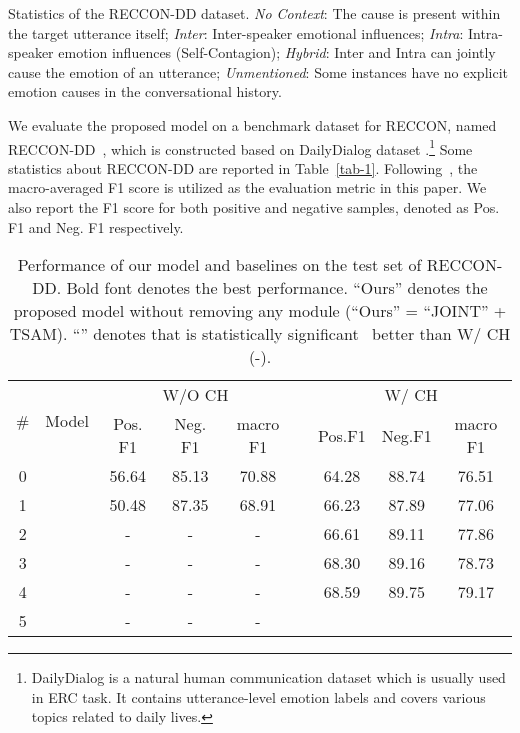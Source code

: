 \documentclass[11pt]{article}
\begin{document}
\begin{table}[tbp]
\caption{Statistics of the RECCON-DD dataset. \textit{No Context}: The cause is present within the target utterance itself; \textit{Inter}: Inter-speaker emotional influences; \textit{Intra}: Intra-speaker emotion influences (Self-Contagion); \textit{Hybrid}: Inter and Intra can jointly cause the emotion of an utterance; \textit{Unmentioned}: Some instances have no explicit emotion causes in the conversational history.}
\label{tab-1}
\end{table}
	
We evaluate the proposed model on a benchmark dataset for RECCON, named RECCON-DD~\citep{poria2021recognizing}, which is constructed based on DailyDialog dataset \cite{li2017dailydialog}.\footnote{DailyDialog is a natural human communication dataset which is usually used in ERC task. It contains utterance-level emotion labels and covers various topics related to daily lives.} Some statistics about RECCON-DD are reported in Table~\ref{tab-1}. Following~\citep{poria2021recognizing}, the macro-averaged F1 score is utilized as the evaluation metric in this paper. We also report the F1 score for both positive and negative samples, denoted as Pos. F1 and Neg. F1 respectively. 


\begin{table*}[tbp]
\centering
\begin{tabular}{@{}c|c|ccccccc@{}}
\hline
\multirow{2}{*}{\#} & \multirow{2}{*}{Model} & \multicolumn{3}{c}{W/O CH}   &  & \multicolumn{3}{c}{W/ CH}  \\ \cmidrule(lr){3-5} \cmidrule(l){7-9} 
                    &                        & Pos. F1 & Neg. F1 & macro F1 &  & Pos.F1 & Neg.F1 & macro F1 \\ \hline\hline
0                   &             &    56.64     &    85.13     &   70.88       &  &    64.28    &    88.74    &   76.51       \\
1                   &            &    50.48     &    87.35     &    68.91      &  &   66.23     &     87.89   &     77.06     \\ \hline
2                   &              & -       & -       & -        &  &   66.61     &    89.11    &   77.86       \\
3                   &            & -       & -       & -        &  &   68.30     &  89.16      &      78.73    \\ \hline
4                   &               & -       & -       & -        &  &     68.59   &     89.75   &    79.17      \\
5                   &            & -       & -       & -        &  &         &        &          \\ \hline
\end{tabular}
\caption{Performance of our model and baselines on the test set of RECCON-DD. Bold font denotes the best performance.
``Ours'' denotes the proposed model without removing any module (``Ours'' = ``JOINT'' + TSAM). ``'' denotes that  is statistically significant~\citep{koehn2004statistical} better than  W/ CH (-).}
\label{tab-2}
\end{table*}
\end{document}
